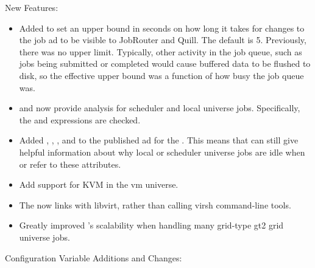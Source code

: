 \noindent New Features:

\begin{itemize}

\item Added  to set an
upper bound in seconds on how long it takes for changes to the job
ad to be visible to JobRouter and Quill.  The default is 5.
Previously, there was no upper limit.  Typically, other activity in
the job queue, such as jobs being submitted or completed would cause
buffered data to be flushed to disk, so the effective upper bound was
a function of how busy the job queue was.

\item {}  and  now provide
  analysis for scheduler and local universe jobs.  Specifically, the
   and
   expressions are checked.

\item Added , ,
, and 
to the published ad for the .  This means that
  can still give helpful information about
why local or scheduler universe jobs are idle when
 or
 refer to these attributes.

\item Add support for KVM in the vm universe.

\item The  now links with libvirt, rather than calling
virsh command-line tools.

\item Greatly improved 's scalability when handling
many grid-type gt2 grid universe jobs.

\end{itemize}

\noindent Configuration Variable Additions and Changes:

